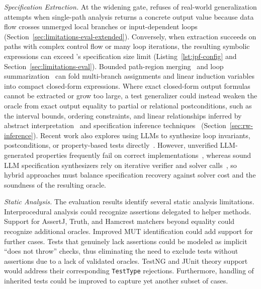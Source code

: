 \textit{Specification Extraction.}
At the widening gate, \ToolTeralizer{} refuses \TzRealworldWideningRefusalsPct{} of real-world generalization attempts when single-path analysis returns a concrete output value because data flow crosses unmerged local branches or input-dependent loops (Section~\ref{sec:limitations-eval-extended}).
Conversely, when extraction succeeds on paths with complex control flow or many loop iterations, the resulting symbolic expressions can exceed \ToolTeralizer{}'s specification size limit (Listing~\ref{lst:jpf-config} and Section~\ref{sec:limitations-eval}).
Bounded path-region merging~\cite{sharma_2020_ranger} and loop summarization~\cite{godefroid_2011_automatic,xie_2016_proteus,kapus_2019_loops} can fold multi-branch assignments and linear induction variables into compact closed-form expressions.
Where exact closed-form output formulas cannot be extracted or grow too large, a test generalizer could instead weaken the oracle from exact output equality to partial or relational postconditions, such as the interval bounds, ordering constraints, and linear relationships inferred by abstract interpretation~\cite{cousot_1977_abstract,partush_2014_abstract} and specification inference techniques~\cite{ernst_2007_daikon,flanagan_2001_houdini,padhi_2016_pie} (Section~\ref{sec:rw-inference}).
Recent work also explores using LLMs to synthesize loop invariants, postconditions, or property-based tests directly~\cite{kamath_2024_loopy,ma_2025_specgen,vikram_2024_pbt,li_2026_probe}.
However, unverified LLM-generated properties frequently fail on correct implementations~\cite{vikram_2024_pbt}, whereas sound LLM specification synthesizers rely on iterative verifier and solver calls~\cite{kamath_2024_loopy,ma_2025_specgen}, so hybrid approaches must balance specification recovery against solver cost and the soundness of the resulting oracle.

\textit{Static Analysis.}
The evaluation results identify several static analysis limitations.
Interprocedural analysis could recognize assertions delegated to helper methods.
Support for AssertJ, Truth, and Hamcrest matchers beyond equality could recognize additional oracles.
Improved MUT identification could add support for further cases.
Tests that genuinely lack assertions could be modeled as implicit ``does not throw'' checks,
thus eliminating the need to exclude tests without assertions
due to a lack of validated oracles.
TestNG and JUnit theory support would
address their corresponding \texttt{TestType} rejections.
Furthermore, handling of inherited tests could be improved
to capture yet another subset of cases.

